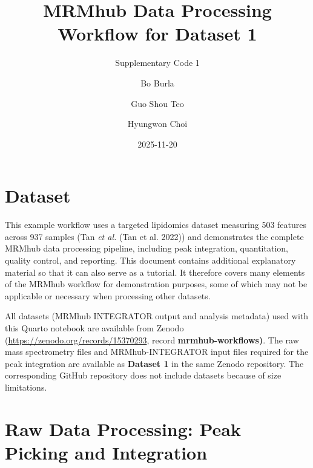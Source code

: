 \documentclass[
  letterpaper,
  DIV=11,
  numbers=noendperiod]{scrartcl}
\title{MRMhub Data Processing Workflow for Dataset 1}
\subtitle{Supplementary Code 1}
\author{Bo Burla \and Guo Shou Teo \and Hyungwon Choi}
\date{2025-11-20}
\renewcommand*\contentsname{Table of contents}
\newcommand\contentsname{Table of contents}
\begin{document}
\maketitle

\renewcommand*\contentsname{Table of contents}
{
\hypersetup{linkcolor=}
\setcounter{tocdepth}{3}
\tableofcontents
}

\section{Dataset}\label{dataset}

This example workflow uses a targeted lipidomics dataset measuring 503
features across 937 samples (Tan \emph{et al.} (Tan et al. 2022)) and
demonstrates the complete MRMhub data processing pipeline, including
peak integration, quantitation, quality control, and reporting. This
document contains additional explanatory material so that it can also
serve as a tutorial. It therefore covers many elements of the MRMhub
workflow for demonstration purposes, some of which may not be applicable
or necessary when processing other datasets.

\begin{tcolorbox}[enhanced jigsaw, colframe=quarto-callout-important-color-frame, title=\textcolor{quarto-callout-important-color}{\faExclamation}\hspace{0.5em}{Important}, colback=white, rightrule=.15mm, breakable, opacitybacktitle=0.6, leftrule=.75mm, arc=.35mm, toptitle=1mm, toprule=.15mm, coltitle=black, opacityback=0, colbacktitle=quarto-callout-important-color!10!white, left=2mm, bottomrule=.15mm, bottomtitle=1mm, titlerule=0mm]

All datasets (MRMhub INTEGRATOR output and analysis metadata) used with
this Quarto notebook are available from Zenodo
(\url{https://zenodo.org/records/15370293}, record
\textbf{mrmhub-workflows)}. The raw mass spectrometry files and
MRMhub-INTEGRATOR input files required for the peak integration are
available as \textbf{Dataset 1} in the same Zenodo repository. The
corresponding GitHub repository does not include datasets because of
size limitations.

\end{tcolorbox}

\section{Raw Data Processing: Peak Picking and
Integration}\label{raw-data-processing-peak-picking-and-integration}
\end{document}

